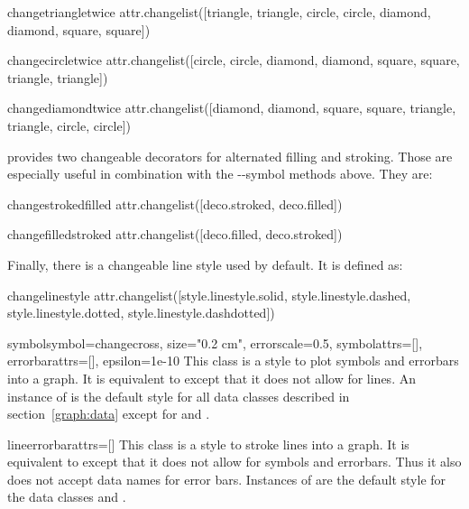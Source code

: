 \begin{memberdesc}{changetriangletwice}
  attr.changelist([triangle, triangle, circle, circle, diamond, diamond, square, square])
\end{memberdesc}

\begin{memberdesc}{changecircletwice}
  attr.changelist([circle, circle, diamond, diamond, square, square, triangle, triangle])
\end{memberdesc}

\begin{memberdesc}{changediamondtwice}
  attr.changelist([diamond, diamond, square, square, triangle, triangle, circle, circle])
\end{memberdesc}

 provides two changeable decorators for alternated filling
and stroking. Those are especially useful in combination with the
--symbol methods above. They are:

\begin{memberdesc}{changestrokedfilled}
  attr.changelist([deco.stroked, deco.filled])
\end{memberdesc}

\begin{memberdesc}{changefilledstroked}
  attr.changelist([deco.filled, deco.stroked])
\end{memberdesc}

Finally, there is a changeable line style used by default. It is
defined as:

\begin{memberdesc}{changelinestyle}
  attr.changelist([style.linestyle.solid, style.linestyle.dashed, style.linestyle.dotted, style.linestyle.dashdotted])
\end{memberdesc}

\begin{classdesc}{symbol}{symbol=changecross, size="0.2 cm",
                          errorscale=0.5, symbolattrs=[],
                          errorbarattrs=[], epsilon=1e-10}
  This class is a style to plot symbols and errorbars into a graph. It
  is equivalent to  except that it does not allow
  for lines. An instance of  is the default style for
  all data classes described in section~\ref{graph:data} except for
   and .
\end{classdesc}

\begin{classdesc}{line}{errorbarattrs=[]}
  This class is a style to stroke lines into a graph. It is equivalent
  to  except that it does not allow for symbols and
  errorbars. Thus it also does not accept data names for error bars.
  Instances of  are the default style for the data classes
   and .
\end{classdesc}

